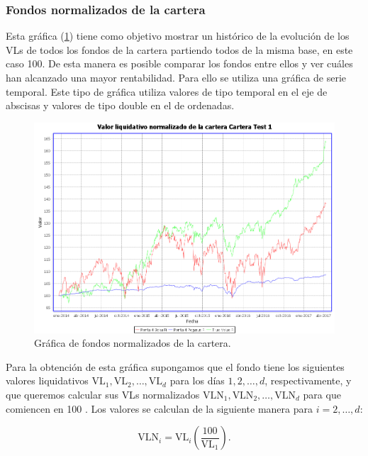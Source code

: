 \documentclass[12pt, a4paper]{book}
\begin{document}
\subsubsection{Fondos normalizados de la cartera}

Esta gráfica (\ref{fig:normalizados}) tiene como objetivo mostrar un histórico de la evolución de los \gls{VL}s de todos los fondos de la cartera partiendo todos de la misma base, en este caso 100. De esta manera es posible comparar los fondos entre ellos y ver cuáles han alcanzado una mayor rentabilidad. Para ello se utiliza una gráfica de serie temporal. Este tipo de gráfica utiliza valores de tipo temporal en el eje de abscisas y valores de tipo double en el de ordenadas.\\

	\begin{figure}[htbp]
	\centering
	\includegraphics[width=\textwidth]{figuras/normalizados.PNG}
	\caption{Gráfica de fondos normalizados de la cartera.}
	\label{fig:normalizados}
	\end {figure}
	
	


Para la obtención de esta gráfica supongamos que el fondo tiene los siguientes valores liquidativos $\text{VL}_1,\text{VL}_2,\ldots,\text{VL}_d$ para los días $1,2,\ldots,d$, respectivamente, y que queremos calcular sus \gls{VL}s normalizados $\text{VLN}_1,\text{VLN}_2,\ldots,\text{VLN}_d$ para que comiencen en 100 . Los valores se calculan de la siguiente manera para $i=2,\ldots,d$:

\begin{equation}
\text{VLN}_i=\text{VL}_i\left(\frac{100}{\text{VL}_1}\right).
\end{equation}
\end{document}
